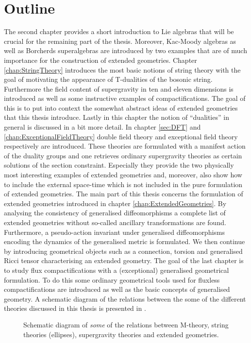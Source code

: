 \section{Outline}
The second chapter provides a short introduction to Lie algebras that will be crucial for the remaining part of the thesis. Moreover, Kac-Moody algebras as well as Borcherds superalgebras are introduced by two examples that are of much importance for the construction of extended geometries. Chapter \ref{chap:StringTheory} introduces the most basic notions of string theory with the goal of motivating the appearance of T-dualities of the bosonic string. Furthermore the field content of supergravity in ten and eleven dimensions is introduced as well as some instructive examples of compactifications. The goal of this is to put into context the somewhat abstract ideas of extended geometries that this thesis introduce. Lastly in this chapter the notion of ``dualities'' in general is discussed in a bit more detail. In chapter \ref{sec:DFT} and \ref{chap:ExceptionalFieldTheory} double field theory and exceptional field theory respectively are introduced. These theories are formulated with a manifest action of the duality groups and one retrieves ordinary supergravity theories as certain solutions of the section constraint. Especially they provide the two physically most interesting examples of extended geometries and, moreover, also show how to include the external space-time which is not included in the pure formulation of extended geometries. The main part of this thesis concerns the formulation of extended geometries introduced in chapter \ref{chap:ExtendedGeometries}. By analysing the consistency of generalised diffeomorphisms a complete list of extended geometries without so-called ancillary transformations are found. Furthermore, a pseudo-action invariant under generalised diffeomorphisms encoding the dynamics of the generalised metric is formulated. We then continue by introducing geometrical objects such as a connection, torsion and generalised Ricci tensor characterising an extended geometry. The goal of the last chapter is to study flux compactifications with a (exceptional) generalised geometrical formulation. To do this some ordinary geometrical tools used for fluxless compactifications are introduced as well as the basic concepts of generalised geometry. A schematic diagram of the relations between the some of the different theories discussed in this thesis is presented in . 


\begin{figure}
    \caption{Schematic diagram of \emph{some} of the relations between M-theory, string theories (ellipses), supergravity theories and extended geometries.}
    \label{fig:TheGodFather}
\end{figure}


